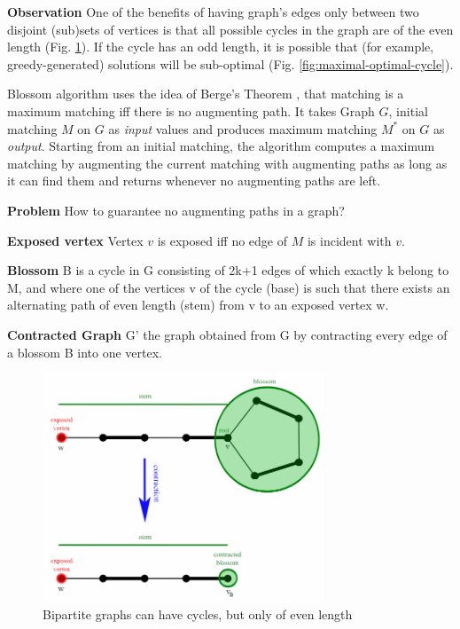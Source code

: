 \textbf{Observation} One of the benefits of having graph's edges only between two disjoint (sub)sets of vertices is that all possible cycles in the graph are of the even length (Fig. \ref{fig:bipartite-even-cycle}). If the cycle has an odd length, it is possible that (for example, greedy-generated) solutions will be sub-optimal (Fig. \ref{fig:maximal-optimal-cycle}).

Blossom algorithm uses the idea of Berge’s Theorem \cite{berge1957two}, that
matching is a maximum matching iff there is no augmenting path.
It takes Graph $G$, initial matching $M$ on $G$ as \textit{input} values and produces maximum matching $M^*$ on $G$ as \textit{output}. Starting from an initial matching, the algorithm computes a maximum matching by augmenting the current matching with augmenting paths as long as it can find them and returns whenever no augmenting paths are left. 

\textbf{Problem} How to guarantee no augmenting paths in a graph?

\begin{definition}
	\textbf{Exposed vertex} Vertex $v$ is exposed iff no edge of $M$ is incident with $v$.
\end{definition}

\begin{definition}
	\textbf{Blossom} B is a cycle in G consisting of 2k+1 edges of which exactly k belong to M, and where one of the vertices v of the cycle (base) is such that there exists an alternating path of even length (stem) from v to an exposed vertex w.
\end{definition}

\begin{definition}
	\textbf{Contracted Graph} G’ the graph obtained from G by contracting every edge of a blossom B into one vertex.
\end{definition}

\begin{figure}
	\centering
	\includegraphics[width=0.75\textwidth]{img/Edmonds_blossom_contraction}
	\caption{Bipartite graphs can have cycles, but only of even length}
	\label{fig:bipartite-even-cycle}
\end{figure}

